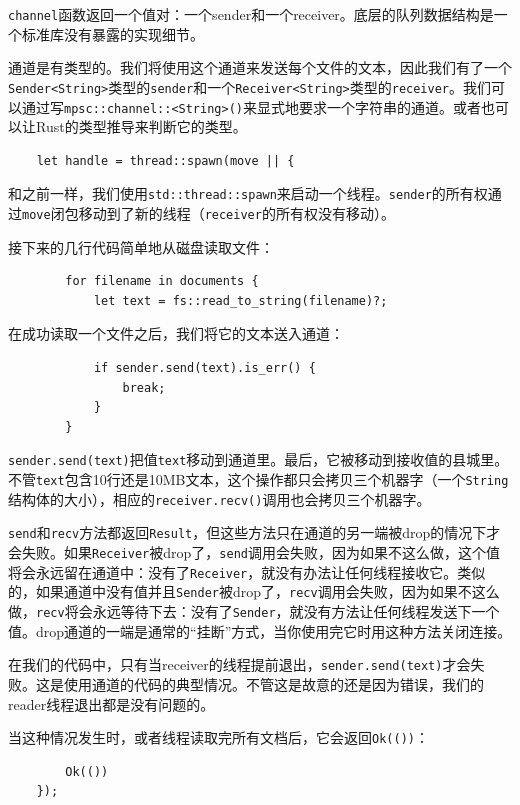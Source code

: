 \texttt{channel}函数返回一个值对：一个sender和一个receiver。底层的队列数据结构是一个标准库没有暴露的实现细节。

通道是有类型的。我们将使用这个通道来发送每个文件的文本，因此我们有了一个\texttt{Sender<String>}类型的\texttt{sender}和一个\texttt{Receiver<String>}类型的\texttt{receiver}。我们可以通过写\texttt{mpsc::channel::<String>()}来显式地要求一个字符串的通道。或者也可以让Rust的类型推导来判断它的类型。

\begin{verbatim}
    let handle = thread::spawn(move || {
\end{verbatim}
和之前一样，我们使用\texttt{std::thread::spawn}来启动一个线程。\texttt{sender}的所有权通过\texttt{move}闭包移动到了新的线程（\texttt{receiver}的所有权没有移动）。

接下来的几行代码简单地从磁盘读取文件：
\begin{verbatim}
        for filename in documents {
            let text = fs::read_to_string(filename)?;
\end{verbatim}

在成功读取一个文件之后，我们将它的文本送入通道：
\begin{verbatim}
            if sender.send(text).is_err() {
                break;
            }
        }
\end{verbatim}

\texttt{sender.send(text)}把值\texttt{text}移动到通道里。最后，它被移动到接收值的县城里。不管\texttt{text}包含10行还是10MB文本，这个操作都只会拷贝三个机器字（一个\texttt{String}结构体的大小），相应的\texttt{receiver.recv()}调用也会拷贝三个机器字。

\texttt{send}和\texttt{recv}方法都返回\texttt{Result}，但这些方法只在通道的另一端被drop的情况下才会失败。如果\texttt{Receiver}被drop了，\texttt{send}调用会失败，因为如果不这么做，这个值将会永远留在通道中：没有了\texttt{Receiver}，就没有办法让任何线程接收它。类似的，如果通道中没有值并且\texttt{Sender}被drop了，\texttt{recv}调用会失败，因为如果不这么做，\texttt{recv}将会永远等待下去：没有了\texttt{Sender}，就没有方法让任何线程发送下一个值。drop通道的一端是通常的“挂断”方式，当你使用完它时用这种方法关闭连接。

在我们的代码中，只有当receiver的线程提前退出，\texttt{sender.send(text)}才会失败。这是使用通道的代码的典型情况。不管这是故意的还是因为错误，我们的reader线程退出都是没有问题的。

当这种情况发生时，或者线程读取完所有文档后，它会返回\texttt{Ok(())}：
\begin{verbatim}
        Ok(())
    });
\end{verbatim}

